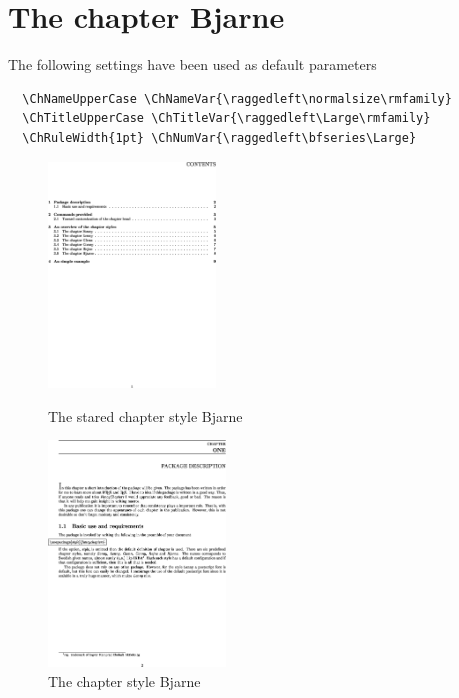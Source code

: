 \documentclass{report}
\begin{document}
    \section{The chapter Bjarne}
    The following settings have been used as default parameters\\
    {\small\begin{verbatim}
  \ChNameUpperCase \ChNameVar{\raggedleft\normalsize\rmfamily}
  \ChTitleUpperCase \ChTitleVar{\raggedleft\Large\rmfamily}
  \ChRuleWidth{1pt} \ChNumVar{\raggedleft\bfseries\Large}
     \end{verbatim}}
    \begin{figure}[h]
      \begin{minipage}{7 cm}
        \centerline{\includegraphics[height=6cm]{Bjarnes.eps}} 
        \caption{The stared chapter style Bjarne}
      \end{minipage}\hfill
      \begin{minipage}{7 cm}
        \centerline{\includegraphics[height=6cm]{Bjarne.eps}}
        \caption{The chapter style Bjarne}
      \end{minipage}\hfill
    \end{figure}
\end{document}

